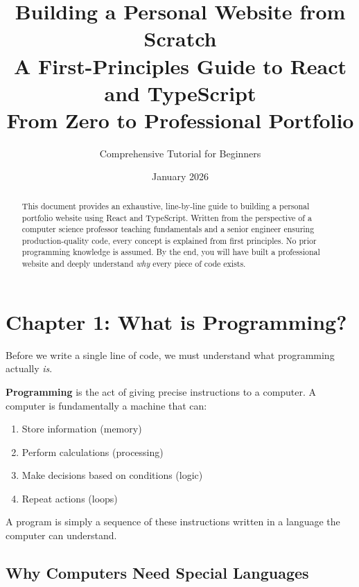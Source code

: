 \documentclass[12pt,a4paper]{article}
\title{\Huge\textbf{Building a Personal Website from Scratch}\\[0.5cm]
\Large A First-Principles Guide to React and TypeScript\\[0.3cm]
\normalsize From Zero to Professional Portfolio}
\author{Comprehensive Tutorial for Beginners}
\date{January 2026}
\begin{document}
\maketitle
\thispagestyle{empty}

\vspace{1cm}

\begin{abstract}
This document provides an exhaustive, line-by-line guide to building a personal portfolio website using React and TypeScript. Written from the perspective of a computer science professor teaching fundamentals and a senior engineer ensuring production-quality code, every concept is explained from first principles. No prior programming knowledge is assumed. By the end, you will have built a professional website and deeply understand \textit{why} every piece of code exists.
\end{abstract}

\newpage
\tableofcontents
\newpage

\section{Chapter 1: What is Programming?}

Before we write a single line of code, we must understand what programming actually \textit{is}.

\begin{concept}
\textbf{Programming} is the act of giving precise instructions to a computer. A computer is fundamentally a machine that can:
\begin{enumerate}
    \item Store information (memory)
    \item Perform calculations (processing)
    \item Make decisions based on conditions (logic)
    \item Repeat actions (loops)
\end{enumerate}
A program is simply a sequence of these instructions written in a language the computer can understand.
\end{concept}

\subsection{Why Computers Need Special Languages}
\end{document}
